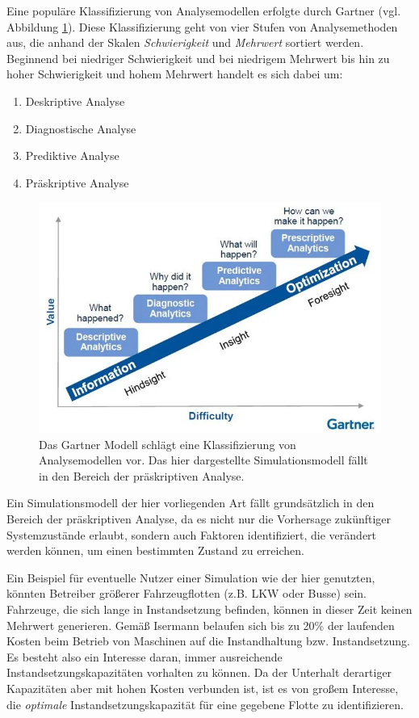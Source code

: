 \documentclass[11pt,a4paper]{article}
\begin{document}
Eine populäre Klassifizierung von Analysemodellen erfolgte durch Gartner \cite{Gartner} (vgl. Abbildung \ref{fig:gartner-modell}).
Diese Klassifizierung geht von vier Stufen von Analysemethoden aus, die anhand der Skalen \emph{Schwierigkeit} und \emph{Mehrwert} sortiert werden.
Beginnend bei niedriger Schwierigkeit und bei niedrigem Mehrwert bis hin zu hoher Schwierigkeit und hohem Mehrwert
handelt es sich dabei um:
\begin{enumerate}
	\item Deskriptive Analyse
	\item Diagnostische Analyse
	\item Prediktive Analyse
	\item Präskriptive Analyse
\end{enumerate}

\begin{figure}
	\label{fig:gartner-modell}
	\centering
	\includegraphics[width=\textwidth]{media/analytic-maturity.png}
	\caption{
		Das Gartner Modell schlägt eine Klassifizierung von Analysemodellen vor.
		Das hier dargestellte Simulationsmodell fällt in den Bereich der 
		präskriptiven Analyse. 
	}
\end{figure}

Ein Simulationsmodell der hier vorliegenden Art fällt grundsätzlich in den Bereich der präskriptiven Analyse, 
da es nicht nur die Vorhersage zukünftiger Systemzustände erlaubt, sondern auch Faktoren identifiziert,
die verändert werden können, um einen bestimmten Zustand zu erreichen.

Ein Beispiel für eventuelle Nutzer einer Simulation wie der hier genutzten, könnten 
Betreiber größerer Fahrzeugflotten (z.B. LKW oder Busse) sein. 
Fahrzeuge, die sich lange in Instandsetzung befinden, können in dieser Zeit keinen Mehrwert generieren.
Gemäß Isermann \cite{Isermann_2011} belaufen sich bis zu 20\% der laufenden Kosten beim Betrieb von Maschinen auf
die Instandhaltung bzw. Instandsetzung. %
Es besteht also ein Interesse daran, immer ausreichende Instandsetzungskapazitäten vorhalten zu können.
Da der Unterhalt derartiger Kapazitäten aber mit hohen Kosten verbunden ist, ist es von großem
Interesse, die \emph{optimale} Instandsetzungskapazität für eine gegebene Flotte zu identifizieren.
\end{document}
